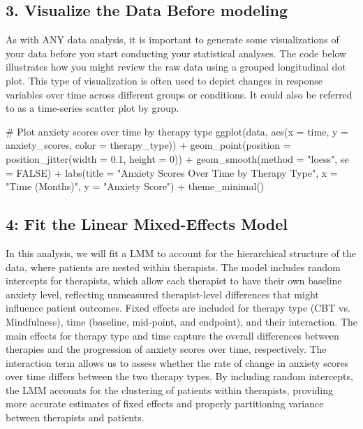 \subsection*{3. Visualize the Data Before modeling}
As with ANY data analysis, it is important to generate some visualizations of your data before you start conducting your statistical analyses.  The code below illustrates how you might review the raw data using a grouped longitudinal dot plot. This type of visualization is often used to depict changes in response variables over time across different groups or conditions. It could also be referred to as a time-series scatter plot by group.
\begin{mycode}[R]
# Plot anxiety scores over time by therapy type
ggplot(data, aes(x = time, y = anxiety_scores, color = therapy_type)) + 
    geom_point(position = position_jitter(width = 0.1, height = 0)) + 
    geom_smooth(method = "loess", se = FALSE) +
    labs(title = "Anxiety Scores Over Time by Therapy Type",
         x = "Time (Months)", y = "Anxiety Score") +
    theme_minimal()
\end{mycode} 

\FloatBarrier %

\subsection*{4: Fit the Linear Mixed-Effects Model}
In this analysis, we will fit a LMM to account for the hierarchical structure of the data, where patients are nested within therapists. The model includes random intercepts for therapists, which allow each therapist to have their own baseline anxiety level, reflecting unmeasured therapist-level differences that might influence patient outcomes. Fixed effects are included for therapy type (CBT vs. Mindfulness), time (baseline, mid-point, and endpoint), and their interaction. The main effects for therapy type and time capture the overall differences between therapies and the progression of anxiety scores over time, respectively. The interaction term allows us to assess whether the rate of change in anxiety scores over time differs between the two therapy types. By including random intercepts, the LMM accounts for the clustering of patients within therapists, providing more accurate estimates of fixed effects and properly partitioning variance between therapists and patients.

